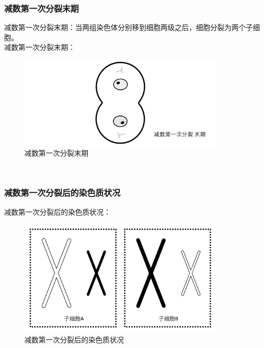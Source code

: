\documentclass[UTF8]{ctexart}
\begin{document}
\subsubsection{减数第一次分裂末期}
    减数第一次分裂末期：当两组染色体分别移到细胞两级之后，细胞分裂为两个子细胞。\\[4mm]
    减数第一次分裂末期：
    \begin{figure}[h]
        \begin{center}
            \includegraphics[width=10cm]{BiologyImage/38.jpg}
            \caption{减数第一次分裂末期}
        \end{center}
    \end{figure}\\

\subsubsection{减数第一次分裂后的染色质状况}
    减数第一次分裂后的染色质状况：
    \begin{figure}[h]
        \begin{center}
            \includegraphics[width=10cm]{BiologyImage/46.jpg}
            \caption{减数第一次分裂后的染色质状况}
        \end{center}
    \end{figure}

\newpage
\end{document}
